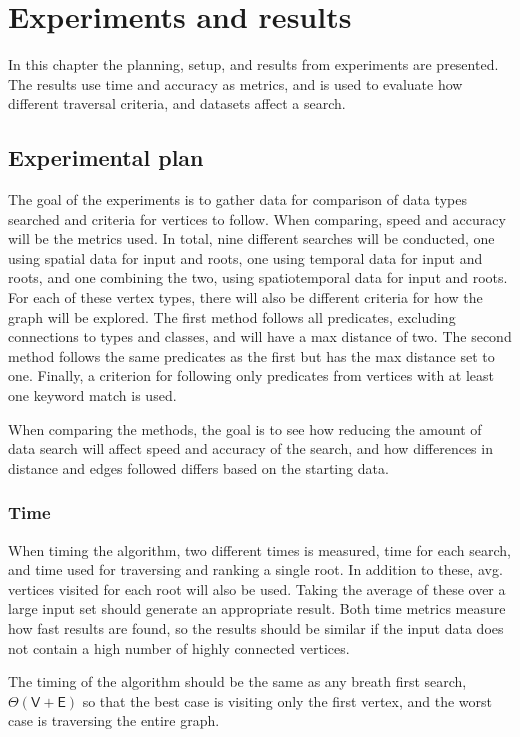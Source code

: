 \chapter{Experiments and results}
\label{cha:Experiments}
In this chapter the planning, setup, and results from experiments are presented. The results use time and accuracy as metrics, and is used to evaluate how different traversal criteria, and datasets affect a search.

\section{Experimental plan}
\label{sec:experimentalPlan}
The goal of the experiments is to gather data for comparison of data types searched and criteria for vertices to follow. When comparing, speed and accuracy will be the metrics used. In total, nine different searches will be conducted, one using spatial data for input and roots, one using temporal data for input and roots, and one combining the two, using spatiotemporal data for input and roots. For each of these vertex types, there will also be different criteria for how the graph will be explored. The first method follows all predicates, excluding connections to types and classes, and will have a max distance of two. The second method follows the same predicates as the first but has the max distance set to one. Finally, a criterion for following only predicates from vertices with at least one keyword match is used.

When comparing the methods, the goal is to see how reducing the amount of data search will affect speed and accuracy of the search, and how differences in distance and edges followed differs based on the starting data.

\subsection{Time}
When timing the algorithm, two different times is measured, time for each search, and time used for traversing and ranking a single root. In addition to these, avg. vertices visited for each root will also be used. Taking the average of these over a large input set should generate an appropriate result. Both time metrics measure how fast results are found, so the results should be similar if the input data does not contain a high number of highly connected vertices.

The timing of the algorithm should be the same as any breath first search, $\Theta(\mathsf{V} + \mathsf{E})$ so that the best case is visiting only the first vertex, and the worst case is traversing the entire graph.

